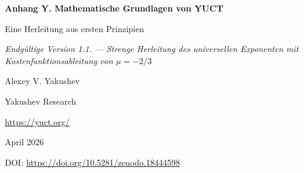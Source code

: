 \documentclass[11pt,a4paper]{article}
\begin{document}
	
	\begin{titlepage}
		\centering
		\vspace*{0cm}
		
		{\Huge\bfseries Anhang Y. Mathematische Grundlagen von YUCT\par}
		\vspace{0.3cm}
		{\Large Eine Herleitung aus ersten Prinzipien\par}
		\vspace{0.3cm}
		{\large \textit{Endgültige Version 1.1. — Strenge Herleitung des universellen Exponenten mit Kostenfunktionsableitung von 
				\(\mu = -2/3\)}\par}
		\vspace{1.5cm}
		
		{\large Alexey V. Yakushev\par}
		\vspace{0.3cm}
		{\normalsize Yakushev Research\par}
		{\normalsize \url{https://yuct.org/}\par}
		
		\vspace{0.5cm}
		{\normalsize April 2026\par}
		\vspace{0.3cm}
		{\normalsize DOI: \url{https://doi.org/10.5281/zenodo.18444598}\par}
		
		\vfill
		
		\begin{abstract}
			\noindent
			Dieses Dokument stellt die mathematischen Grundlagen der Yakushev Unified Coordination Theory (YUCT) in einer strengen und in sich geschlossenen Form dar. Ausgehend von der Definition von Koordinationsclustern und dem Effizienzparameter \(K_{\mathrm{eff}}\) konstruieren wir ein mikroskopisches Modell eines Koordinationsnetzwerks. Aus drei fundamentalen Axiomen – hierarchische Skaleninvarianz, binäre Vollständigkeit des Wörterbuchs und dreidimensionale Einbettung – bestimmen wir die Verteilung der Entropie über die Ebenen. Durch Hinzufügen eines vierten Axioms der makroskopischen Skaleninvarianz und einer expliziten Kostenfunktion für die Indexübermittlung leiten wir das universelle Fehlergesetz \(\varepsilon \propto K_{\mathrm{eff}}^{-\beta}\) mit \(\beta = 2/3\) als Theorem ab. Die effektive skalare–tensorielle Wirkung für das Koordinationsfeld, die modifizierten Einstein-Gleichungen, der topologische Ursprung der kosmologischen Konstanten und die Fermionen-Massenhierarchie werden dann als Konsequenzen oder Vermutungen eingeführt, die auf dem Kern-Theorem aufbauen. Alle Aussagen sind explizit als Axiom, Theorem, Vermutung, Annahme oder phänomenologisches Gesetz gekennzeichnet. Die Theorie macht konkrete, falsifizierbare Vorhersagen, einschließlich einer temperaturabhängigen Gravitationskonstanten. Ein neuer Abschnitt verbindet das universelle Fehlergesetz mit der asymptotischen Verteilung der Primzahlen (Theorem~4 des Haupttextes) und zeigt, dass derselbe Exponent \(\beta = 2/3\) die Primzahlfluktuationen bestimmt.
		\end{abstract}
		

\end{titlepage}
\end{document}
